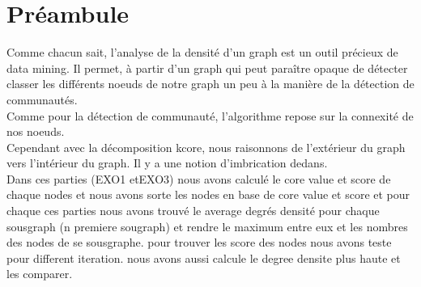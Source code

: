 \documentclass[a4paper,10pt]{report}
\begin{document}
\section{Préambule}
Comme chacun sait, l'analyse de la densité d'un graph est un outil précieux de data mining.
Il permet, à partir d'un graph qui peut paraître opaque de détecter classer les différents noeuds de notre graph un peu à la manière de la détection de communautés. 
\\
Comme pour la détection de communauté, l'algorithme repose sur la connexité de nos noeuds.
\\
Cependant avec la décomposition kcore, nous raisonnons de l'extérieur du graph vers l'intérieur du graph. Il y a une notion d'imbrication dedans.
\\
Dans ces parties (EXO1 etEXO3) nous avons calculé le core value et score de chaque nodes et nous avons sorte les nodes en base de core value et score et pour chaque ces parties nous avons trouvé le average degrés densité pour chaque sousgraph (n premiere sougraph) et rendre le maximum entre eux et les nombres des nodes de se sousgraphe. pour trouver les score des nodes nous avons teste pour different iteration. 
nous avons aussi calcule le degree densite plus haute et les comparer.
\\
\end{document}
